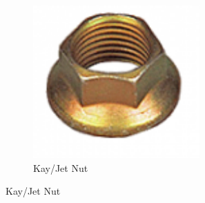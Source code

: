 \documentclass[10pt,letterpaper]{book}
\begin{document}
\begin{figure}[H]
\begin{subfigure}[b]{.24\linewidth}
			\includegraphics[width=0.7\textwidth]{imgs/kaynut.png}
			\caption{Kay/Jet Nut}
		\end{subfigure}
		

\end{figure}
\end{document}
